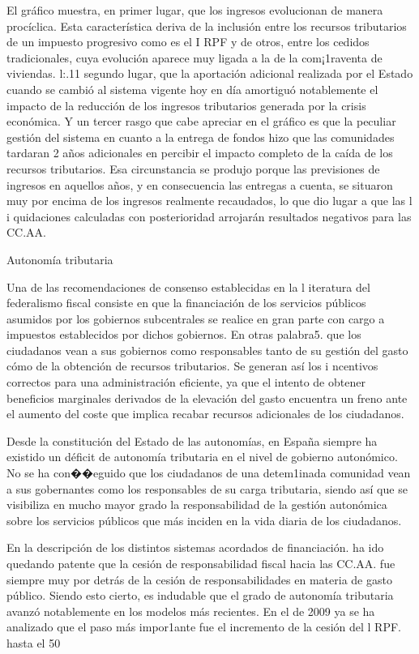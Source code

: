\documentclass[10pt,a4paper]{article}
\begin{document}
El gráfico muestra, en primer lugar, que los ingresos evolucionan de manera procíclica. Esta característica deriva de la inclusión entre los recursos tributarios de un impuesto progresivo como es el I RPF y de otros, entre los cedidos tradicionales, cuya evolución aparece muy ligada a la de la com¡1raventa de viviendas. l:.11 segundo lugar, que la aportación adicional realizada por el Estado cuando se cambió al sistema vigente hoy en día amortiguó notablemente el impacto de la reducción de los ingresos tributarios generada por la crisis económica. Y un tercer rasgo que cabe apreciar en el gráfico es que la peculiar gestión del sistema en cuanto a la entrega de fondos hizo que las comunidades tardaran 2 años adicionales en percibir el impacto completo de la caída de los recursos tributarios. Esa circunstancia se produjo porque las previsiones de ingresos en aquellos años, y en consecuencia las entregas a cuenta, se situaron muy por encima de los ingresos realmente recaudados, lo que dio lugar a que las l i quidaciones calculadas con posterioridad arrojarán resultados negativos para las CC.AA.

Autonomía tributaria 

Una de las recomendaciones de consenso establecidas en la l iteratura del federalismo fiscal consiste en que la financiación de los servicios públicos asumidos por los gobiernos subcentrales se realice en gran parte con cargo a impuestos establecidos por dichos gobiernos. En otras palabra5. que los ciudadanos vean a sus gobiernos como responsables tanto de su gestión del gasto cómo de la obtención de recursos tributarios. Se generan así los i ncentivos correctos para una administración eficiente, ya que el intento de obtener beneficios marginales derivados de la elevación del gasto encuentra un freno ante el aumento del coste que implica recabar recursos adicionales de los ciudadanos.

Desde la constitución del Estado de las autonomías, en España siempre ha existido un déficit de autonomía tributaria en el nivel de gobierno autonómico. No se ha con��eguido que los ciudadanos de una detem1inada comunidad vean a sus gobernantes como los responsables de su carga tributaria, siendo así que se visibiliza en mucho mayor grado la responsabilidad de la gestión autonómica sobre los servicios públicos que más inciden en la vida diaria de los ciudadanos.

En la descripción de los distintos sistemas acordados de financiación. ha ido quedando patente que la cesión de responsabilidad fiscal hacia las CC.AA. fue siempre muy por detrás de la cesión de responsabilidades en materia de gasto público. Siendo esto cierto, es indudable que el grado de autonomía tributaria avanzó notablemente en los modelos más recientes. En el de 2009 ya se ha analizado que el paso más impor1ante fue el incremento de la cesión del l RPF. hasta el 50%
\end{document}
